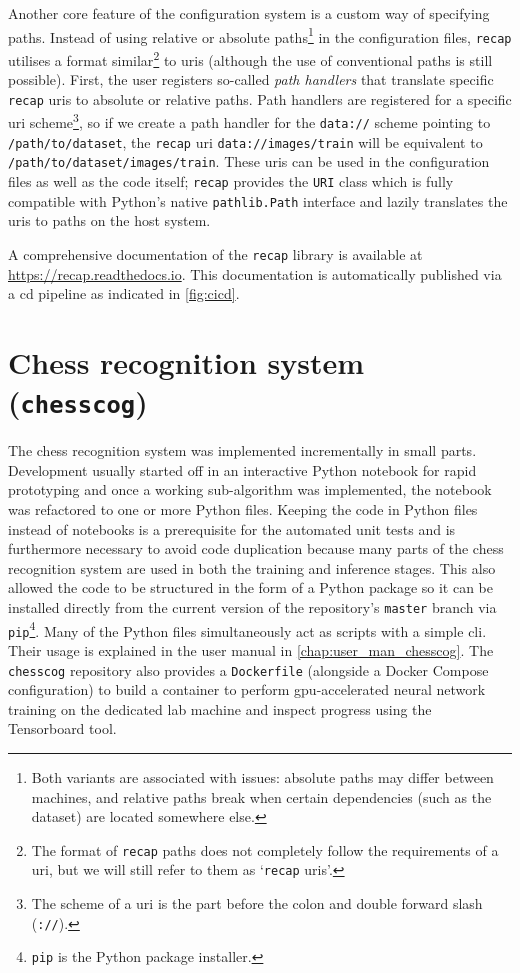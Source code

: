 \documentclass[../main.tex]{subfiles}
\begin{document}
Another core feature of the configuration system is a custom way of specifying paths.
Instead of using relative or absolute paths\footnote{Both variants are associated with issues: absolute paths may differ between machines, and relative paths break when certain dependencies (such as the dataset) are located somewhere else.} in the configuration files, \texttt{recap} utilises a format similar\footnote{The format of \texttt{recap} paths does not completely follow the requirements of a \gls{uri}, but we will still refer to them as `\texttt{recap} \glspl{uri}'.} to \glspl{uri} (although the use of conventional paths is still possible).
First, the user registers so-called \emph{path handlers} that translate specific \texttt{recap} \glspl{uri} to absolute or relative paths.
Path handlers are registered for a specific \gls{uri} scheme\footnote{The scheme of a \gls{uri} is the part before the colon and double forward slash (\texttt{://}).}, so if we create a path handler for the \texttt{data://} scheme pointing to \texttt{/path/to/dataset}, the \texttt{recap} \gls{uri} \texttt{data://images/train} will be equivalent to \texttt{/path/to/dataset/images/train}.
These \glspl{uri} can be used in the configuration files as well as the code itself; 
\texttt{recap} provides the \texttt{URI} class which is fully compatible with Python's native \texttt{pathlib.Path} interface and lazily translates the \glspl{uri} to paths on the host system.

A comprehensive documentation of the \texttt{recap} library is available at \url{https://recap.readthedocs.io}.
This documentation is automatically published via a \gls{cd} pipeline as indicated in \cref{fig:cicd}.

\section{Chess recognition system (\texttt{chesscog})}
The chess recognition system was implemented incrementally in small parts. 
Development usually started off in an interactive Python notebook for rapid prototyping and once a working sub-algorithm was implemented, the notebook was refactored to one or more Python files.
Keeping the code in Python files instead of notebooks is a prerequisite for the automated unit tests and is furthermore necessary to avoid code duplication because many parts of the chess recognition system are used in both the training and inference stages.
This also allowed the code to be structured in the form of a Python package so it can be installed directly from the current version of the repository's \texttt{master} branch via \texttt{pip}\footnote{\texttt{pip} is the Python package installer.}.
Many of the Python files simultaneously act as scripts with a simple \gls{cli}.
Their usage is explained in the user manual in \cref{chap:user_man_chesscog}.
The \texttt{chesscog} repository also provides a \texttt{Dockerfile} (alongside a Docker Compose configuration) to build a container to perform \gls{gpu}-accelerated neural network training on the dedicated lab machine and inspect progress using the Tensorboard tool.
\end{document}
